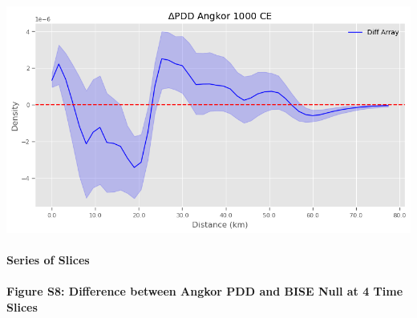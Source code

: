 \documentclass[
  11pt,
  letterpaper,
  DIV=11,
  numbers=noendperiod]{scrartcl}
\let\oldparagraph\paragraph
\renewcommand{\paragraph}[1]{\oldparagraph{#1}\mbox{}}
\begin{document}
\includegraphics{analysis_files/figure-pdf/cell-16-output-1.png}

\paragraph{Series of Slices}\label{series-of-slices}

\paragraph{Figure S8: Difference between Angkor PDD and BISE Null at 4
Time
Slices}\label{figure-s8-difference-between-angkor-pdd-and-bise-null-at-4-time-slices}
\end{document}
